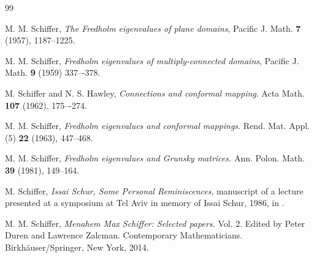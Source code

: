 \documentclass[12pt]{amsart}
\theoremstyle{plain}
\theoremstyle{definition}
\theoremstyle{remark}
\numberwithin{equation}{section} %
\numberwithin{figure}{section} %
\begin{document}
\begin{thebibliography}{99}



 M. M. Schiffer, {\it The Fredholm eigenvalues of plane domains}, Pacific J. Math. {\bf 7} (1957), 1187--1225.

 M. M. Schiffer, {\it Fredholm eigenvalues of multiply-connected domains}, Pacific J. Math. {\bf 9} (1959) 337–-378.

 M. Schiffer and N. S. Hawley, {\it Connections and conformal mapping}. Acta Math. {\bf 107} (1962), 175–-274. 

 M. M. Schiffer, {\it Fredholm eigenvalues and conformal mappings}. Rend. Mat. Appl. (5)
 {\bf 22} (1963), 447--468.

 M. M. Schiffer, {\it Fredholm eigenvalues and Grunsky matrices.} Ann. Polon. Math. {\bf 39} (1981), 149--164.

 M. Schiffer, {\it Issai Schur, Some Personal Reminiscences}, manuscript of a lecture presented at a symposium at Tel Aviv in memory of Issai Schur, 1986, in \cite{Schiffer_collected_2}. 


 M. M. Schiffer,  {\it Menahem Max Schiffer\emph{:} Selected papers.} Vol. 2. Edited by Peter Duren and Lawrence Zalcman. Contemporary Mathematicians. Birkhäuser/Springer, New York, 2014.




\end{thebibliography}
\end{document}
